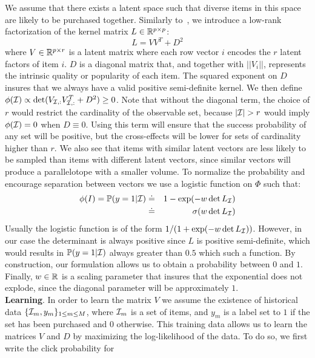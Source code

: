 We assume that there exists a latent space such that diverse items in this space
are likely to be purchased together. Similarly
to~\cite{DBLP:conf/aaai/GartrellPK17}, we introduce a low-rank factorization of
the kernel matrix $L \in \mathbb{R}^{p \times p}$:
\begin{equation}
L = VV^T+D^2
\end{equation}
where $V \in \mathbb{R}^{p \times r}$ is a latent matrix where each row vector $i$
encodes the $r$ latent factors of item $i$.  $D$ is a diagonal matrix that, and
together with $||V_i||$, represents the intrinsic quality or popularity of each
item. The squared exponent on $D$ insures that we always have a valid positive
semi-definite kernel. We then define $\phi(\mathcal{I}) \propto \det (V_{\mathcal{I},:}
V_{\mathcal{I},:}^T+D^2) \geq 0$. Note that without the diagonal term, the choice of
$r$ would restrict the cardinality of the observable set, because $|\mathcal{I}| > r$
would imply $\phi(\mathcal{I}) = 0$ when $D\equiv0$. Using this term will ensure that
the success probability of any set will be positive, but the cross-effects will
be lower for sets of cardinality higher than $r$. We also see that items with
similar latent vectors are less likely to be sampled than items with different
latent vectors, since similar vectors will produce a parallelotope with a
smaller volume. To normalize the probability and encourage separation between
vectors we use a logistic function on $\Phi$ such that:
\begin{eqnarray}
\label{themodel}
\phi(I) = \mathbb{P}(y=1|\mathcal{I}) & \doteq & 1-\exp(-w \det L_{\mathcal{I}}) \\
& \doteq & \sigma(w \det L_{\mathcal{I}})
\end{eqnarray}
Usually the logistic function is of the form $1/(1+\exp(-w \det L_{\mathcal{I}}))$.
However, in our case the determinant is always positive since $L$ is positive
semi-definite, which would results in $\mathbb{P}(y=1|\mathcal{I})$ always greater than $0.5$ which such a function. By
construction, our formulation allows us to obtain a probability between $0$ and
$1$. Finally, $w \in \mathbb{R}$ is a scaling parameter that insures that the exponential
does not explode, since the diagonal parameter will be approximately $1$. \\
%
\textbf{Learning}. In order to learn the matrix $V$ we assume the existence of
historical data $\{\mathcal{I}_m,y_m\}_{1 \leq m \leq M}$, where $\mathcal{I}_m$ is a set of
items, and $y_m$ is a label set to $1$ if the set has been purchased and $0$
otherwise. This training data allows us to learn the matrices $V$ and $D$ by maximizing the
log-likelihood of the data. To do so, we first write the click probability for
